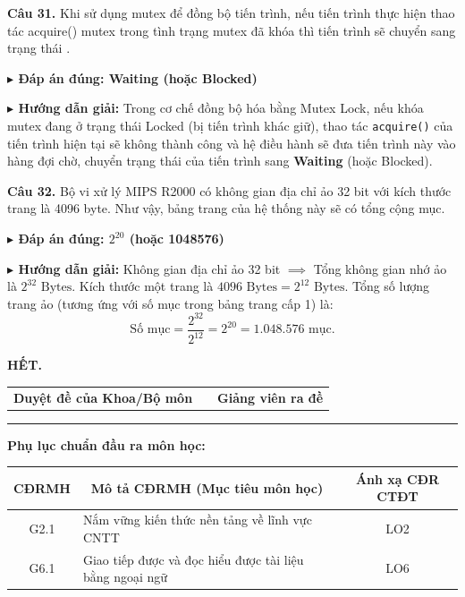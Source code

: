\documentclass[11pt,a4paper]{article}
\newcommand{\giaithich}[2]{%
    \par\vspace{0.15cm}\noindent
    \begingroup\small
    \noindent\textbf{\color{blue}$\blacktriangleright$ Đáp án đúng: #1} \par\vspace{0.08cm}
    \noindent\textbf{\color{teal}$\blacktriangleright$ Hướng dẫn giải:} #2
    \endgroup\par\vspace{0.35cm}
}
\begin{document}
\vspace{0.2cm}
\noindent\textbf{Câu 31.} Khi sử dụng mutex để đồng bộ tiến trình, nếu tiến trình thực hiện thao tác acquire() mutex trong tình trạng mutex đã khóa thì tiến trình sẽ chuyển sang trạng thái \underline{\hspace{4cm}}.
\giaithich{Waiting (hoặc Blocked)}{Trong cơ chế đồng bộ hóa bằng Mutex Lock, nếu khóa mutex đang ở trạng thái Locked (bị tiến trình khác giữ), thao tác \texttt{acquire()} của tiến trình hiện tại sẽ không thành công và hệ điều hành sẽ đưa tiến trình này vào hàng đợi chờ, chuyển trạng thái của tiến trình sang \textbf{Waiting} (hoặc Blocked).}

\vspace{0.2cm}
\noindent\textbf{Câu 32.} Bộ vi xử lý MIPS R2000 có không gian địa chỉ ảo 32 bit với kích thước trang là 4096 byte. Như vậy, bảng trang của hệ thống này sẽ có tổng cộng \underline{\hspace{2.5cm}} mục.
\giaithich{$2^{20}$ (hoặc 1048576)}{Không gian địa chỉ ảo 32 bit $\implies$ Tổng không gian nhớ ảo là $2^{32}\text{ Bytes}$.
Kích thước một trang là $4096\text{ Bytes} = 2^{12}\text{ Bytes}$.
Tổng số lượng trang ảo (tương ứng với số mục trong bảng trang cấp 1) là:
$$\text{Số mục} = \frac{2^{32}}{2^{12}} = 2^{20} = 1.048.576\text{ mục.}$$}

\vspace{0.5cm}
\begin{center}
    \textbf{HẾT.}
\end{center}

\vspace{0.5cm}
\noindent
\begin{tabularx}{\textwidth}{X c X}
\centering\textbf{Duyệt đề của Khoa/Bộ môn} & & \centering\textbf{Giảng viên ra đề}\tabularnewline
\end{tabularx}

\vspace{1.5cm}

\noindent\rule{\textwidth}{0.4pt}
\vspace{0.2cm}
\noindent\textbf{Phụ lục chuẩn đầu ra môn học:}
\begin{center}
\begin{tabular}{|c|p{9.5cm}|c|}
\hline
\textbf{CĐRMH} & \multicolumn{1}{c|}{\textbf{Mô tả CĐRMH (Mục tiêu môn học)}} & \textbf{Ánh xạ CĐR CTĐT} \\ \hline
G2.1 & Nắm vững kiến thức nền tảng về lĩnh vực CNTT & LO2 \\ \hline
G6.1 & Giao tiếp được và đọc hiểu được tài liệu bằng ngoại ngữ & LO6 \\ \hline
\end{tabular}
\end{center}
\end{document}

